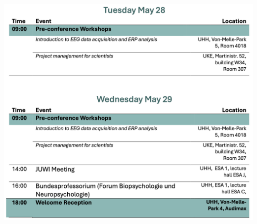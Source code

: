 	
	\begin{center}
		\includegraphics[width=1\textwidth]{tex/images/programme_overview/Tue_Wed.png}
	\end{center}
		
	\newpage

